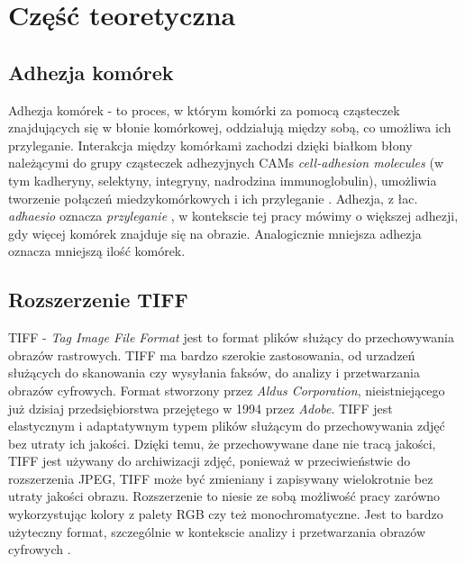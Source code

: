 \documentclass{article}
\begin{document}
    \newpage
    \section{Część teoretyczna}
        \subsection{Adhezja komórek}
        {
            \label{sec:adhezja-komorek}
            \Large
            \justifying
            \quad
            Adhezja komórek - to proces, w którym komórki za pomocą cząsteczek znajdujących się w błonie komórkowej, oddziałują między sobą, co umożliwa ich przyleganie.
            Interakcja między komórkami zachodzi dzięki białkom błony należącymi do grupy cząsteczek adhezyjnych CAMs \textit{cell-adhesion molecules} (w tym kadheryny, selektyny, integryny, nadrodzina immunoglobulin), umożliwia tworzenie połączeń miedzykomórkowych i ich przyleganie
            \cite{Molecular Biology of the Cell. 4th edition}.
            Adhezja, z łac. \textit {adhaesio} oznacza \textit{przyleganie} \cite{adhezja}, w kontekscie tej pracy mówimy o większej adhezji, gdy więcej komórek znajduje się na obrazie.
            Analogicznie mniejsza adhezja oznacza mniejszą ilość komórek.
        }
        \subsection{Rozszerzenie TIFF}
        {
            \label{sec:rozszerzenie-tiff}
            \Large
            \justifying
            \quad
            TIFF - \textit{Tag Image File Format} jest to format plików służący do przechowywania obrazów rastrowych.
            TIFF ma bardzo szerokie zastosowania, od urzadzeń służących do skanowania czy wysyłania faksów, do analizy i przetwarzania obrazów cyfrowych.
            Format stworzony przez \textit{Aldus Corporation}, nieistniejącego już dzisiaj przedsiębiorstwa przejętego w 1994 przez \textit{Adobe}.
            TIFF jest elastycznym i adaptatywnym typem plików służącym do przechowywania zdjęć bez utraty ich jakości.
            Dzięki temu, że przechowywane dane nie tracą jakości, TIFF jest używany do archiwizacji zdjęć, ponieważ w przeciwieństwie do rozszerzenia JPEG,
            TIFF może być zmieniany i zapisywany wielokrotnie bez utraty jakości obrazu.
            Rozszerzenie to niesie ze sobą możliwość pracy zarówno wykorzystując kolory z palety RGB czy też monochromatyczne.
            Jest to bardzo użyteczny format, szczególnie w kontekscie analizy i przetwarzania obrazów cyfrowych \cite{Encyclopedia of Graphics File Formats: The Complete Reference}.
        }
\end{document}
